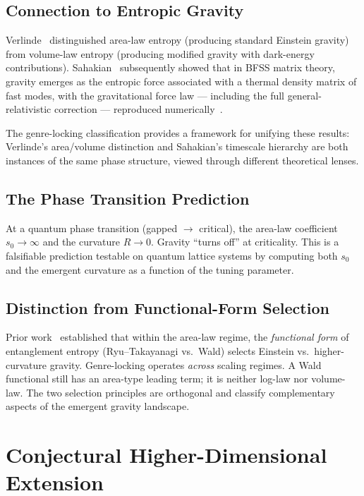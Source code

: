 \documentclass[aps,prd,twocolumn,superscriptaddress,nofootinbib,floatfix]{revtex4-2}
\newcommand{\sn}{s_0}
\begin{document}
\subsection{Connection to Entropic Gravity}

Verlinde~\cite{Verlinde2017} distinguished area-law entropy (producing standard Einstein gravity) from volume-law entropy (producing modified gravity with dark-energy contributions). Sahakian~\cite{Sahakian2025} subsequently showed that in BFSS matrix theory, gravity emerges as the entropic force associated with a thermal density matrix of fast modes, with the gravitational force law --- including the full general-relativistic correction --- reproduced numerically~\cite{AldamTajimaSahakian2026}.

The genre-locking classification provides a framework for unifying these results: Verlinde's area/volume distinction and Sahakian's timescale hierarchy are both instances of the same phase structure, viewed through different theoretical lenses.

\subsection{The Phase Transition Prediction}

At a quantum phase transition (gapped $\to$ critical), the area-law coefficient $\sn \to \infty$ and the curvature $R \to 0$. Gravity ``turns off'' at criticality. This is a falsifiable prediction testable on quantum lattice systems by computing both $\sn$ and the emergent curvature as a function of the tuning parameter.

\subsection{Distinction from Functional-Form Selection}

Prior work~\cite{Faulkner2014,Swingle2014,Haehl2018} established that within the area-law regime, the \emph{functional form} of entanglement entropy (Ryu--Takayanagi vs.\ Wald) selects Einstein vs.\ higher-curvature gravity. Genre-locking operates \emph{across} scaling regimes. A Wald functional still has an area-type leading term; it is neither log-law nor volume-law. The two selection principles are orthogonal and classify complementary aspects of the emergent gravity landscape.

\section{Conjectural Higher-Dimensional Extension}
\label{sec:higherD}
\end{document}

